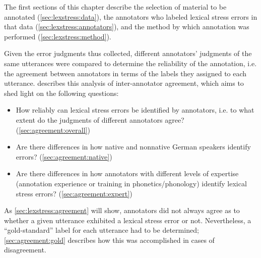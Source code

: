 	
	The first sections of this chapter describe the selection of material to be annotated (\cref{sec:lexstress:data}), the annotators who labeled lexical stress errors in that data (\cref{sec:lexstress:annotators}), and the method by which annotation was performed (\cref{sec:lexstress:method}). 
	
	Given the error judgments thus collected, 
	different annotators' judgments of the same utterances were compared to determine the reliability of the annotation, i.e. the agreement between annotators in terms of the labels they assigned to each utterance.
	 describes this analysis of inter-annotator agreement, which aims to shed light on the following questions:
	\begin{itemize}
	\item{How reliably can lexical stress errors be identified by
	annotators, i.e. to what extent do the judgments of different annotators agree?  (\cref{sec:agreement:overall})}
	\item{Are there differences in how native and nonnative German speakers identify errors?  (\cref{sec:agreement:native})}
	\item{Are there differences in how 
	annotators with different levels of expertise
	(annotation experience or training in phonetics/phonology) identify lexical stress errors?  (\cref{sec:agreement:expert})} 
	\end{itemize}
	As \cref{sec:lexstress:agreement} will show, annotators did not always agree as to whether a given utterance exhibited a lexical stress error or not. Nevertheless, a ``gold-standard'' label for each utterance had to be determined; \cref{sec:agreement:gold} describes how this was accomplished in cases of disagreement.
	
